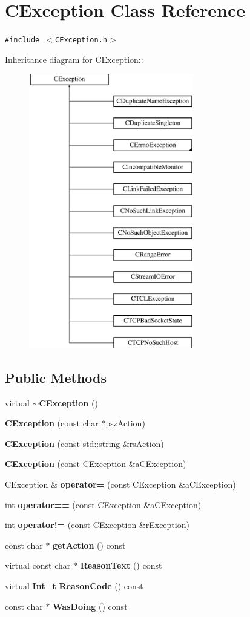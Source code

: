 \section{CException  Class Reference}
\label{classCException}
{\tt \#include $<$CException.h$>$}

Inheritance diagram for CException::\begin{figure}[H]
\begin{center}
\leavevmode
\includegraphics[height=12cm]{classCException}
\end{center}
\end{figure}
\subsection*{Public Methods}
\begin{CompactItemize}
\item 
virtual {\bf $\sim$CException} ()
\item 
{\bf CException} (const char $\ast$psz\-Action)
\item 
{\bf CException} (const std::string \&rs\-Action)
\item 
{\bf CException} (const CException \&a\-CException)
\item 
CException \& {\bf operator=} (const CException \&a\-CException)
\item 
int {\bf operator==} (const CException \&a\-CException)
\item 
int {\bf operator!=} (const CException \&r\-Exception)
\item 
const char $\ast$ {\bf get\-Action} () const
\item 
virtual const char $\ast$ {\bf Reason\-Text} () const
\item 
virtual {\bf Int\_\-t} {\bf Reason\-Code} () const
\item 
const char $\ast$ {\bf Was\-Doing} () const
\end{CompactItemize}
